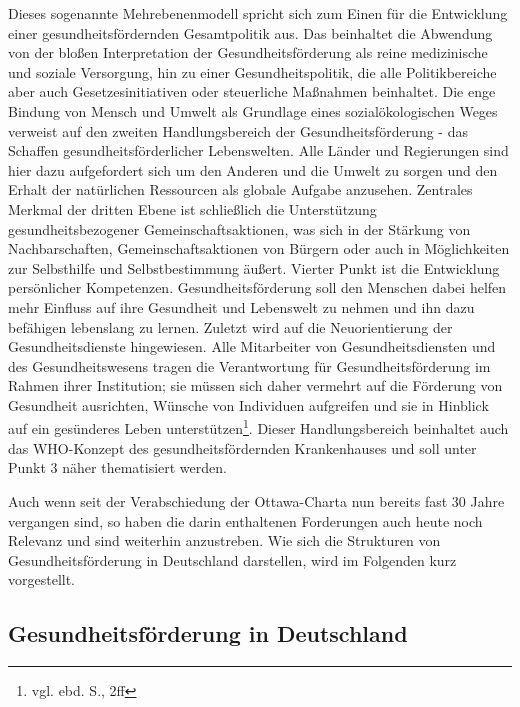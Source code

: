 Dieses sogenannte Mehrebenenmodell spricht sich zum Einen für die Entwicklung einer gesundheitsfördernden Gesamtpolitik aus. Das beinhaltet die Abwendung von der bloßen Interpretation der Gesundheitsförderung als reine medizinische und soziale Versorgung, hin zu einer Gesundheitspolitik, die alle Politikbereiche aber auch Gesetzesinitiativen oder steuerliche Maßnahmen beinhaltet. Die enge Bindung von Mensch und Umwelt als Grundlage eines sozialökologischen Weges verweist auf den zweiten Handlungsbereich der Gesundheitsförderung - das Schaffen gesundheitsförderlicher Lebenswelten. Alle Länder und Regierungen sind hier dazu aufgefordert sich um den Anderen und die Umwelt zu sorgen und den Erhalt der natürlichen Ressourcen als globale Aufgabe anzusehen. Zentrales Merkmal der dritten Ebene ist schließlich die Unterstützung gesundheitsbezogener Gemeinschaftsaktionen, was sich in der Stärkung von Nachbarschaften, Gemeinschaftsaktionen von Bürgern oder auch in Möglichkeiten zur Selbsthilfe und Selbstbestimmung äußert. Vierter Punkt ist die Entwicklung persönlicher Kompetenzen. Gesundheitsförderung soll den Menschen dabei helfen mehr Einfluss auf ihre Gesundheit und Lebenswelt zu nehmen und ihn dazu befähigen lebenslang zu lernen. Zuletzt wird auf die Neuorientierung der Gesundheitsdienste hingewiesen. Alle Mitarbeiter von Gesundheitsdiensten und des Gesundheitswesens tragen die Verantwortung für Gesundheitsförderung im Rahmen ihrer Institution; sie müssen sich daher vermehrt auf die Förderung von Gesundheit ausrichten, Wünsche von Individuen aufgreifen und sie in Hinblick auf ein gesünderes Leben unterstützen\footnote{vgl. ebd. S., 2ff}. Dieser Handlungsbereich beinhaltet auch das WHO-Konzept des gesundheitsfördernden Krankenhauses und soll unter Punkt 3 näher thematisiert werden.

Auch wenn seit der Verabschiedung der Ottawa-Charta nun bereits fast 30 Jahre vergangen sind, so haben die darin enthaltenen Forderungen auch heute noch Relevanz und sind weiterhin anzustreben. Wie sich die Strukturen von Gesundheitsförderung in Deutschland darstellen, wird im Folgenden kurz vorgestellt.

\subsection{Gesundheitsförderung in Deutschland}
\label{sec:GesundheitsförderungInDeutschland}

